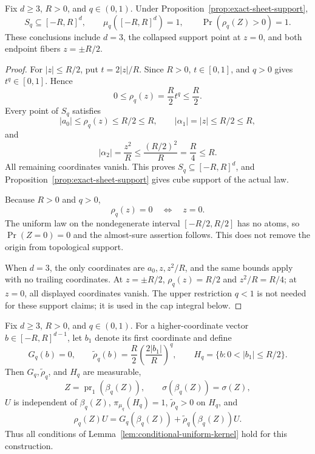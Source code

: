 \begin{proposition}
\label{prop:cube-positive-width}
Fix $d\geq3$, $R>0$, and $q\in(0,1)$.  Under
Proposition~\ref{prop:exact-sheet-support},
\[
S_q\subseteq[-R,R]^d,
\qquad
\mu_q([-R,R]^d)=1,
\qquad
\Pr(\rho_q(Z)>0)=1.
\]
These conclusions include $d=3$, the collapsed support point at $z=0$,
and both endpoint fibers $z=\pm R/2$.
\end{proposition}

\begin{proof}
For $|z|\leq R/2$, put $t=2|z|/R$.  Since $R>0$, $t\in[0,1]$, and
$q>0$ gives $t^q\in[0,1]$.  Hence
\[
0\leq\rho_q(z)=\frac R2t^q\leq\frac R2.
\]
Every point of $S_q$ satisfies
\[
|a_0|\leq\rho_q(z)\leq R/2\leq R,
\qquad
|\alpha_1|=|z|\leq R/2\leq R,
\]
and
\[
|\alpha_2|=\frac{z^2}{R}
\leq\frac{(R/2)^2}{R}=\frac R4\leq R.
\]
All remaining coordinates vanish.  This proves
$S_q\subseteq[-R,R]^d$, and
Proposition~\ref{prop:exact-sheet-support} gives cube support of the
actual law.

Because $R>0$ and $q>0$,
\[
\rho_q(z)=0\quad\Longleftrightarrow\quad z=0.
\]
The uniform law on the nondegenerate interval $[-R/2,R/2]$ has no atoms,
so $\Pr(Z=0)=0$ and the almost-sure assertion follows.  This does not
remove the origin from topological support.

When $d=3$, the only coordinates are $a_0,z,z^2/R$, and the same bounds
apply with no trailing coordinates.  At $z=\pm R/2$,
$\rho_q(z)=R/2$ and $z^2/R=R/4$; at $z=0$, all displayed coordinates
vanish.  The upper restriction $q<1$ is not needed for these support
claims; it is used in the cap integral below.
\end{proof}

\begin{lemma}
\label{lem:latent-recovery}
Fix $d\geq3$, $R>0$, and $q\in(0,1)$.  For a higher-coordinate vector
$b\in[-R,R]^{d-1}$, let $b_1$ denote its first coordinate and define
\[
G_q(b)=0,
\qquad
\widetilde\rho_q(b)
=\frac R2\left(\frac{2|b_1|}{R}\right)^q,
\qquad
H_q=\{b:0<|b_1|\leq R/2\}.
\]
Then $G_q,\widetilde\rho_q$, and $H_q$ are measurable,
\[
Z=\operatorname{pr}_1(\beta_q(Z)),
\qquad
\sigma(\beta_q(Z))=\sigma(Z),
\]
$U$ is independent of $\beta_q(Z)$,
$\pi_{\mu_q}(H_q)=1$, $\widetilde\rho_q>0$ on $H_q$, and
\[
\rho_q(Z)U
=G_q(\beta_q(Z))+\widetilde\rho_q(\beta_q(Z))U.
\]
Thus all conditions of Lemma~\ref{lem:conditional-uniform-kernel} hold
for this construction.
\end{lemma}

